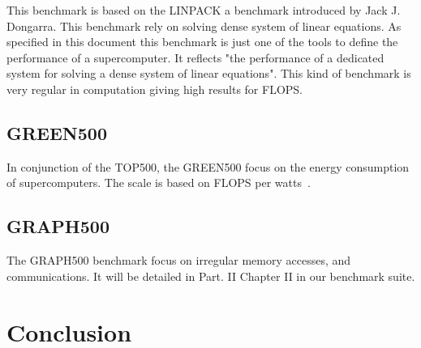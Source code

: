 This benchmark is based on the LINPACK\cite{dongarra1994top500} a benchmark introduced by Jack J. Dongarra.
This benchmark rely on solving  dense system of linear equations. 
As specified in this document this benchmark is just one of the tools to define the performance of a supercomputer. 
It reflects "the performance of a dedicated system for solving a dense system of linear equations".
This kind of benchmark is very regular in computation giving high results for FLOPS. 

\subsection{GREEN500}
In conjunction of the TOP500, the GREEN500 focus on the energy consumption of supercomputers. 
The scale is based on FLOPS per watts~\cite{feng2007green500}.

\subsection{GRAPH500}
The GRAPH500 benchmark focus on irregular memory accesses, and communications.
It will be detailed in Part. II Chapter II in our benchmark suite. 


\section{Conclusion}


